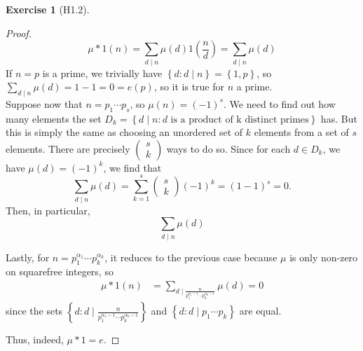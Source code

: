 \documentclass[reqno]{amsart}
\theoremstyle{definition}
\newtheorem{exercise}[theorem]{Exercise}
\theoremstyle{remark}
\begin{document}
    \begin{exercise}[H1.2]
        \begin{proof}
            \[
            \mu * 1 (n)
            = \sum_{d \mid n}
            \mu (d) 1 \left( \frac{n}{d} \right) 
            = \sum_{d \mid n} \mu(d)
            \] 
            If $n = p$ is a prime, we trivially
            have
            $\left\{ d \colon d \mid n \right\} 
            = \left\{ 1,p \right\} $, so
            $\sum_{d \mid n} \mu (d) =
            1 -1 = 0 = e(p)$, so it is true for
            $n$ a prime.\\
            \linebreak
            Suppose now that
            $n = p_1 \cdots p_s$, so
            $\mu (n) = (-1)^{s}$. 
            We need to find out how many
            elements the set
            $D_k = 
            \left\{ d  \mid n \colon
            d \text{ is a product of k distinct primes}\right\} $
            has.
            But this is simply the same as choosing
            an unordered set of $k$ elements from a set
            of  $s$ elements. There
            are precisely
            $\begin{pmatrix} s\\ k \end{pmatrix} $ ways to do
            so. Since for each $d \in D_k$,
            we have $\mu (d) = (-1)^{k}$, we find
            that
            \[
            \sum_{d  \mid n}\mu (d)
            = \sum_{k=1}^{s} \begin{pmatrix} s\\k \end{pmatrix} 
            (-1)^{k}
            = (1-1)^{s}
            = 0.
            \] 
            Then, in particular,
            \[
            \sum_{d  \mid n} \mu(d)
            \] 


            Lastly, for
            $n = p_1^{\alpha_1} \cdots p_{k}^{\alpha_{k}}$, it
            reduces to the previous case because
            $\mu$ is only non-zero on squarefree integers, so
            \begin{align*}
                \mu * 1 (n)
                &= \sum_{d  \mid \frac{n}{p_1^{\alpha_1-1} 
                \cdots p_k^{\alpha_k-1}}}
                \mu (d) = 0
            \end{align*}
            since the sets
            $\left\{ d \colon
            d  \mid 
        \frac{n}{p_1^{\alpha_1 - 1} \cdots
    p_k^{\alpha_k -1}}\right\} $ and
    $\left\{ d \colon
    d  \mid p_1 \cdots p_k \right\} $ are equal.

    Thus, indeed, $\mu * 1 = e$.
        \end{proof}
    \end{exercise}
\end{document}
